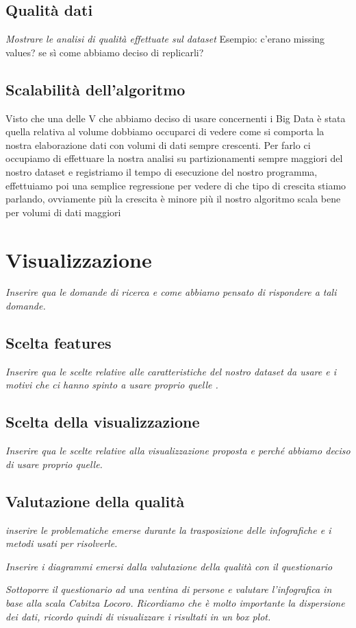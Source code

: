 \documentclass[10pt, a4paper,openany]{article}
\begin{document}
\subsection*{Qualità dati}
\textit{Mostrare le analisi di qualità effettuate sul dataset} Esempio: c'erano missing values? se sì come abbiamo deciso di replicarli?

\subsection*{Scalabilità dell'algoritmo}

Visto che una delle V che abbiamo deciso di usare concernenti i Big Data è stata quella relativa al volume dobbiamo occuparci di vedere come si comporta la nostra elaborazione dati con volumi di dati sempre crescenti. Per farlo ci occupiamo di effettuare la nostra analisi su partizionamenti sempre maggiori del nostro dataset e registriamo il tempo di esecuzione del nostro programma, effettuiamo poi una semplice regressione per vedere di che tipo di crescita stiamo parlando, ovviamente più la crescita è minore più il nostro algoritmo scala bene per volumi di dati maggiori
\section*{Visualizzazione}

\textit{Inserire qua le domande di ricerca e come abbiamo pensato di rispondere a tali domande.}

\subsection*{Scelta features}
\textit{Inserire qua le scelte relative alle caratteristiche del nostro dataset da usare e i motivi che ci hanno spinto a usare proprio quelle .}
\subsection*{Scelta della visualizzazione}
\textit{Inserire qua le scelte relative alla visualizzazione proposta e perché abbiamo deciso di usare proprio quelle.}
\subsection*{Valutazione della qualità}
\textit{inserire le problematiche emerse durante la trasposizione delle infografiche e i metodi usati per risolverle.}

\textit{Inserire i diagrammi emersi dalla valutazione della qualità con il questionario}

\textit{Sottoporre il questionario ad una ventina di persone e valutare l'infografica in base alla scala Cabitza Locoro. Ricordiamo che è molto importante la dispersione dei dati, ricordo quindi di visualizzare i risultati in un box plot.}
\end{document}
